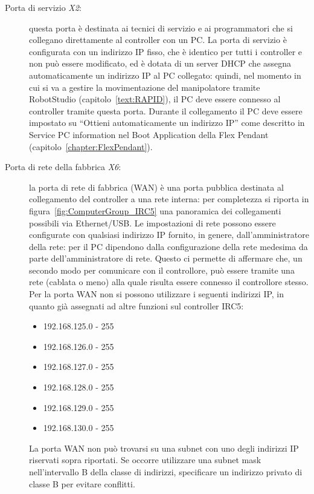 \begin{description}
	\item[Porta di servizio \textsl{X2}:]\label{item:Porta_servizio} questa porta è destinata ai tecnici di servizio e ai programmatori che si collegano direttamente al controller con un PC.
	La porta di servizio è configurata con un indirizzo IP fisso, che è identico per tutti i controller e non può essere modificato, ed è dotata di un server DHCP che assegna automaticamente un indirizzo IP al PC collegato: quindi, nel momento in cui si va a gestire la movimentazione del manipolatore tramite RobotStudio (capitolo~\vref{text:RAPID}), il PC deve essere connesso al controller tramite questa porta.
	Durante il collegamento il PC deve essere impostato su “Ottieni automaticamente un indirizzo IP” come descritto in Service PC information nel Boot Application della Flex Pendant (capitolo~\vref{chapter:FlexPendant}).
	
	\item[Porta di rete della fabbrica \textsl{X6}:] la porta di rete di fabbrica (WAN) è una porta pubblica destinata al collegamento del controller a una rete interna: per completezza si riporta in figura~\vref{fig:ComputerGroup_IRC5} una panoramica dei collegamenti possibili via Ethernet/USB. 
	Le impostazioni di rete possono essere configurate con qualsiasi indirizzo IP fornito, in genere, dall'amministratore della rete: per il PC dipendono dalla configurazione della rete medesima da parte dell’amministratore di rete.
	Questo ci permette di affermare che, un secondo modo per comunicare con il controllore, può essere tramite una rete (cablata o meno) alla quale risulta essere connesso il controllore stesso.
	Per la porta WAN non si possono utilizzare i seguenti indirizzi IP, in quanto già assegnati ad altre funzioni sul controller IRC5:
	\begin{itemize}
		\item 192.168.125.0 - 255
		\item 192.168.126.0 - 255
		\item 192.168.127.0 - 255
		\item 192.168.128.0 - 255
		\item 192.168.129.0 - 255
		\item 192.168.130.0 - 255
	\end{itemize}
	La porta WAN non può trovarsi su una subnet con uno degli indirizzi IP riservati sopra riportati. Se occorre utilizzare una subnet mask nell'intervallo B della classe di indirizzi, specificare un indirizzo privato di classe B per evitare conflitti.
\end{description}
